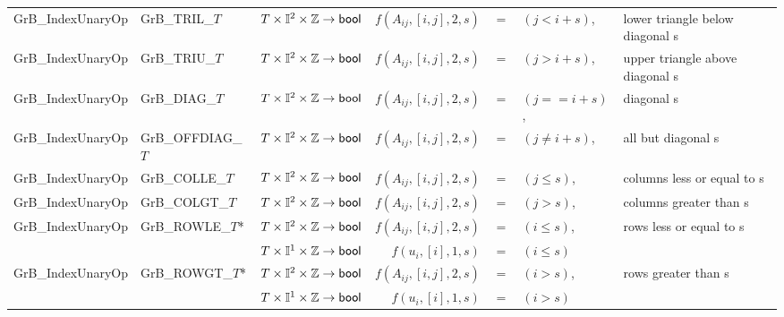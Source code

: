 \begin{landscape}
\begin{table}[h]
\begin{threeparttable}
\begin{tabular}{l|l|l|rcll}
{\sf GrB\_IndexUnaryOp}   & {\sf GrB\_TRIL\_$T$}       & $T \times \mathbb{I}^2 \times \mathbb{Z} \rightarrow {\sf bool}$ & $f(A_{ij},[i,j],2,s)$ & $=$ & $(j < i + s)$, & lower triangle below diagonal s \\
{\sf GrB\_IndexUnaryOp}   & {\sf GrB\_TRIU\_$T$}       & $T \times \mathbb{I}^2 \times \mathbb{Z} \rightarrow {\sf bool}$ & $f(A_{ij},[i,j],2,s)$ & $=$ & $(j > i + s)$, & upper triangle above diagonal s \\
{\sf GrB\_IndexUnaryOp}   & {\sf GrB\_DIAG\_$T$}       & $T \times \mathbb{I}^2 \times \mathbb{Z} \rightarrow {\sf bool}$ & $f(A_{ij},[i,j],2,s)$ & $=$ & $(j == i + s)$, & diagonal s \\
{\sf GrB\_IndexUnaryOp}   & {\sf GrB\_OFFDIAG\_$T$}    & $T \times \mathbb{I}^2 \times \mathbb{Z} \rightarrow {\sf bool}$ & $f(A_{ij},[i,j],2,s)$ & $=$ & $(j \neq i + s)$, & all but diagonal s \\
{\sf GrB\_IndexUnaryOp}   & {\sf GrB\_COLLE\_$T$}      & $T \times \mathbb{I}^2 \times \mathbb{Z} \rightarrow {\sf bool}$ & $f(A_{ij},[i,j],2,s)$ & $=$ & $(j \leq s)$, & columns less or equal to s \\
{\sf GrB\_IndexUnaryOp}   & {\sf GrB\_COLGT\_$T$}      & $T \times \mathbb{I}^2 \times \mathbb{Z} \rightarrow {\sf bool}$ & $f(A_{ij},[i,j],2,s)$ & $=$ & $(j > s)$, & columns greater than s \\
{\sf GrB\_IndexUnaryOp}   & {\sf GrB\_ROWLE\_$T$}*     & $T \times \mathbb{I}^2 \times \mathbb{Z} \rightarrow {\sf bool}$ & $f(A_{ij},[i,j],2,s)$ & $=$ & $(i \leq s)$, & rows less or equal to s \\
                          &                            & $T \times \mathbb{I}^1 \times \mathbb{Z} \rightarrow {\sf bool}$ & $f(u_{i},[i],1,s)$ & $=$ & $(i \leq s)$ \\
{\sf GrB\_IndexUnaryOp}   & {\sf GrB\_ROWGT\_$T$}*     & $T \times \mathbb{I}^2 \times \mathbb{Z} \rightarrow {\sf bool}$ & $f(A_{ij},[i,j],2,s)$ & $=$ & $(i > s)$, & rows greater than s \\
                          &                            & $T \times \mathbb{I}^1 \times \mathbb{Z} \rightarrow {\sf bool}$ & $f(u_{i},[i],1,s)$ & $=$ & $(i > s)$ \\
\hline
                     

\end{tabular}
\end{threeparttable}
\end{table}
\end{landscape}
